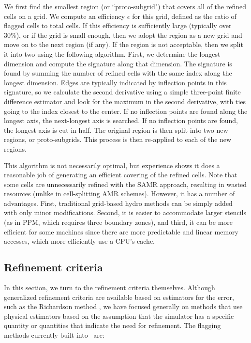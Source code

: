 We first find the smallest region (or ``proto-subgrid") that covers all of the refined cells on a grid.  We compute an efficiency $\epsilon$ for this grid, defined as the ratio of flagged cells to total cells.  If this efficiency is sufficiently large (typically over 30\%), or if the grid is small enough, then we adopt the region as a new grid and move on to the next region (if any).  If the region is not acceptable, then we split it into two using the following algorithm.  First, we determine the longest dimension and compute the signature along that dimension.  The signature is found by summing the number of refined cells with the same index along the longest dimension.  Edges are typically indicated by inflection points in this signature, so we calculate the second derivative using a simple three-point finite difference estimator and look for the maximum in the second derivative, with ties going to the index closest to the center.  If no inflection points are found along the longest axis, the next-longest axis is searched.  If no inflection points are found, the longest axis is cut in half.  The original region is then split into two new regions, or proto-subgrids.  This process is then re-applied to each of the new regions.

This algorithm is not necessarily optimal, but experience shows it does a reasonable job of generating an efficient covering of the refined cells.  Note that some cells are unnecessarily refined with the SAMR approach, resulting in wasted resources (unlike in cell-splitting AMR schemes).  However, it has a number of advantages.  First, traditional grid-based hydro methods can be simply added with only minor modifications.  Second, it is easier to accommodate larger stencils (as in PPM, which requires three boundary zones), and third, it can be more efficient for some machines since there are more predictable and linear memory accesses, which more efficiently use a CPU's cache.


\subsection{Refinement criteria}
\label{sec:refinement_criteria}

In this section, we turn to the refinement criteria themselves.
Although generalized refinement criteria are available based on
estimators for the error, such as the Richardson method \citep{AtkinsonHan2004}, we have focused generally on methods that use physical estimators based on the assumption that the simulator has a specific quantity or quantities that indicate the need for refinement.  The flagging methods currently built into \enzo\ are:

